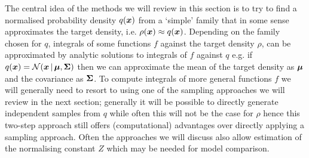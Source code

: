 
The central idea of the methods we will review in this section is to try to find a normalised probability density $q(\boldsymbol{x})$ from a `simple' family that in some sense approximates the target density, i.e. $\rho(\boldsymbol{x}) \approx q(\boldsymbol{x})$. Depending on the family chosen for $q$, integrals of some functions $f$ against the target density $\rho$, can be approximated by analytic solutions to integrals of $f$ against $q$ e.g. if $q(\vct{x}) = \nrm{\vct{x} \gvn \vct{\mu},\mtx{\Sigma}}$ then we can approximate the mean of the target density as $\boldsymbol{\mu}$ and the covariance as $\boldsymbol{\Sigma}$. To compute integrals of more general functions $f$ we will generally need to resort to using one of the sampling approaches we will review in the next section; generally it will be possible to directly generate independent samples from $q$ while often this will not be the case for $\rho$ hence this two-step approach still offers (computational) advantages over directly applying a sampling approach. Often the approaches we will discuss also allow estimation of the normalising constant $Z$ which may be needed for model comparison.

